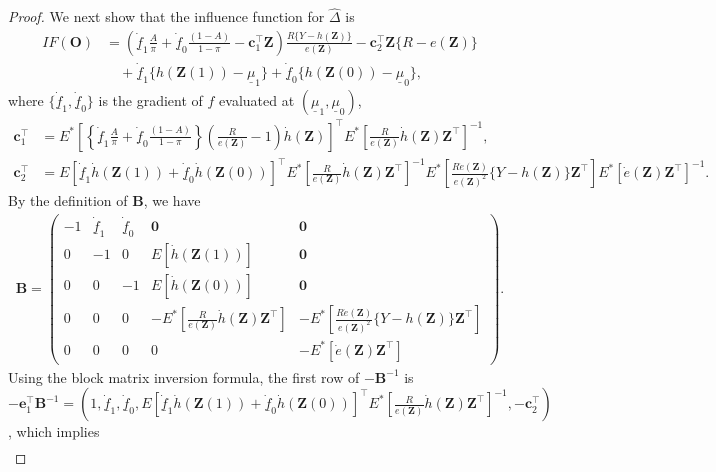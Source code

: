 \documentclass[12pt]{article}
\newcommand{\bO}{\boldsymbol{O}}
\newcommand{\bZ}{\boldsymbol{Z}}
\newcommand{\bzero}{\boldsymbol{0}}
\newcommand{\bfB}{\mathbf{B}}
\begin{document}
\begin{proof}
    We next show that the influence function for $\widehat{\Delta}$ is
    \begin{align}
    IF(\bO)& = \left(\dot{\underline{f}}_1\frac{A}{\pi} + \dot{\underline{f}}_0\frac{(1-A)}{1-\pi} - \boldsymbol{c}_1^\top \bZ\right)\frac{R\{Y-h(\bZ)\}}{ e(\bZ)} - \boldsymbol{c}_2^\top \bZ \{R - e(\bZ)\} \nonumber\\
    &\quad + \dot{\underline{f}}_1\{h(\bZ(1)) - \underline{\mu}_1\} + \dot{\underline{f}}_0\{h(\bZ(0)) - \underline{\mu}_0\}, \label{IF_formula}  
    \end{align}
where $\{\dot{\underline{f}}_1,  \dot{\underline{f}}_0\}$ is the gradient of $f$ evaluated at $(\underline{\mu}_1, \underline{\mu}_0)$,
\begin{align*}
    \boldsymbol{c}_1^\top  &= E^*\left[\left\{\dot{\underline{f}}_1\frac{A}{\pi} + \dot{\underline{f}}_0\frac{(1-A)}{1-\pi}\right\}\left(\frac{R}{e(\bZ)}-1\right)\dot{h}(\bZ) \right]^\top E^*\left[\frac{R}{e(\bZ)}\dot{h}(\bZ)\bZ^\top\right]^{-1},\\
    \boldsymbol{c}_2^\top &=  E[\dot{\underline{f}}_1\dot{h}(\bZ(1)) + \dot{\underline{f}}_0\dot{h}(\bZ(0))]^\top E^*\left[\frac{R}{e(\bZ)}\dot{h}(\bZ)\bZ^\top\right]^{-1} E^*\left[\frac{R\dot{e}(\bZ)}{e(\bZ)^2}\{Y - h(\bZ)\}\bZ^\top\right]E^*[ \dot{e}(\bZ)\bZ^\top]^{-1}.
\end{align*}
By the definition of $\bfB$, we have
\begin{align*}
    \bfB = \left(\begin{array}{ccccc}
        -1 & \dot{\underline{f}}_1 &  \dot{\underline{f}}_0 & \bzero & \bzero\\
        0 & -1 & 0 & E[\dot{h}(\bZ(1))] & \bzero \\
        0 & 0 & -1 & E[\dot{h}(\bZ(0))] & \bzero \\
        0 & 0 & 0 &  -E^*[\frac{R}{e(\bZ)} \dot{h}(\bZ) \bZ^\top] & -E^*[\frac{R\dot{e}(\bZ)}{e(\bZ)^2}\{Y-h(\bZ)\}\bZ^\top] \\
        0 & 0 & 0 & 0 & - E^*[\dot{e}(\bZ) \bZ^\top]
    \end{array}\right).
\end{align*}
Using the block matrix inversion formula, the first row of $-\bfB^{-1}$ is \\ $-\boldsymbol{e}_1^\top \bfB^{-1} = (1, \dot{\underline{f}}_1,  \dot{\underline{f}}_0, E[\dot{\underline{f}}_1\dot{h}(\bZ(1)) + \dot{\underline{f}}_0\dot{h}(\bZ(0))]^\top E^*\left[\frac{R}{e(\bZ)}\dot{h}(\bZ)\bZ^\top\right]^{-1}, -\boldsymbol{c}_2^\top)$, which implies
\begin{align*}

\end{align*}
\end{proof}
\end{document}

